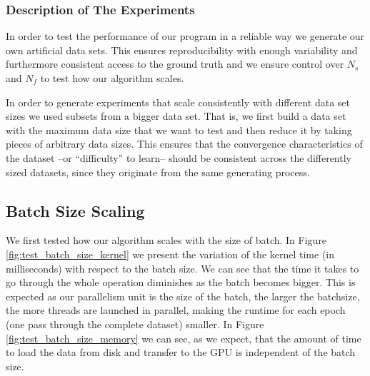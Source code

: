 \documentclass[11pt,a4paper]{article}
\begin{document}
\subsubsection*{Description of The Experiments}
In order to test the performance of our program in a reliable way we 
generate our own artificial data sets. This ensures reproducibility with enough
variability and furthermore consistent access to the ground truth and 
we ensure control over $N_s$ and $N_f$ to test how our algorithm scales. 

In order to generate experiments that scale consistently  with different
data set sizes we used subsets from a bigger data set. 
That is, we first build a data set with the maximum data size that we want to 
test and then reduce it by taking pieces of arbitrary data sizes. This ensures
that the convergence characteristics of the dataset --or ``difficulty'' to learn--
should be consistent across the differently sized datasets, since they originate
from the same generating process.

\subsection{Batch Size Scaling}

We first tested how our algorithm scales with the size of batch. 
In Figure \ref{fig:test_batch_size_kernel} we present the variation 
of the kernel time (in milliseconds) with respect to the batch size. 
We can see that the time it takes to go through the whole operation 
diminishes as the batch becomes bigger. This is expected as our parallelism
unit is the size of the batch, the larger the batchsize, the more threads
are launched in parallel, making the runtime for each epoch (one pass through the
complete dataset) smaller. 
In Figure \ref{fig:test_batch_size_memory} we can see, as we expect, 
that the amount of time to load the data from disk and transfer to the GPU is 
independent of the batch size. 
\end{document}
